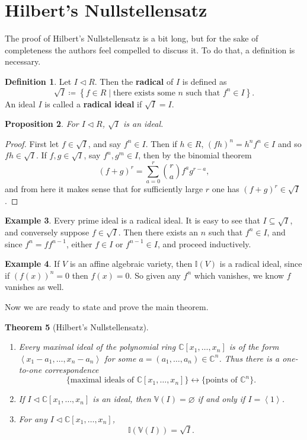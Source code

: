 \documentclass[letterpaper]{article}
\newtheorem{theorem}{Theorem}[section]
\newtheorem{proposition}[theorem]{Proposition}
\theoremstyle{definition}
\newtheorem{definition}[theorem]{Definition}
\newtheorem{example}[theorem]{Example}
\theoremstyle{remark}
\newcommand\CC{\mathbb{C}}
\newcommand\VV{\mathbb{V}}
\newcommand\II{\mathbb{I}}
\newcommand{\defeq}{\coloneqq}
\newcommand{\ideal}{\vartriangleleft}
\newcommand{\brackets}[1]{\left[#1\right]}
\newcommand{\setbraces}[1]{\left\{#1\right\}}
\newcommand{\abrackets}[1]{\left\langle#1\right\rangle}
\begin{document}
\section{Hilbert's Nullstellensatz}
The proof of Hilbert's Nullstellensatz is a bit long, but for the sake of completeness the authors feel compelled to discuss it. To do that, a definition is necessary. \begin{definition}
    Let $I\ideal R$. Then the \textbf{radical} of $I$ is defined as \[\sqrt I\defeq \setbraces{f\in R\mid \text{there exists some }n\text{ such that } f^n\in I}.\] An ideal $I$ is called a \textbf{radical ideal} if $\sqrt I = I$. 
\end{definition}
\begin{proposition}
    For $I\ideal R$, $\sqrt I$ is an ideal.
\end{proposition} \begin{proof} First let $f\in\sqrt I$, and say $f^n\in I$. Then if $h\in R$, $(fh)^n=h^nf^n\in I$ and so $fh\in \sqrt I$. If $f,g\in \sqrt I$, say $f^n,g^m\in I$, then by the binomial theorem \[(f+g)^r=\sum_{a=0}^r \binom{r}{a}f^ag^{r-a},\] and from here it makes sense that for sufficiently large $r$ one has $(f+g)^r\in \sqrt I$. 
\end{proof} \begin{example}
    Every prime ideal is a radical ideal. It is easy to see that $I\subseteq \sqrt I$, and conversely suppose $f\in \sqrt I$. Then there exists an $n$ such that $f^n\in I$, and since $f^n=ff^{n-1}$, either $f\in I$ or $f^{n-1}\in I$, and proceed inductively. 
\end{example}
\begin{example}\label{ex:I-is-radical}
	If \(V\) is an affine algebraic variety, then \(\II(V)\) is a radical ideal, since if \((f(x))^n=0\) then \(f(x)=0\). So given any \(f^n\) which vanishes, we know \(f\) vanishes as well. 
\end{example}
Now we are ready to state and prove the main theorem. \begin{theorem}[Hilbert's Nullstellensatz]\label{Nullstellensatz} $~$
    \begin{enumerate}[label=(\roman*)]
        \item Every maximal ideal of the polynomial ring $\CC\brackets{x_1,\dots,x_n}$ is of the form $\abrackets{x_1-a_1,\dots, x_n-a_n}$ for some $a=(a_1,\dots,a_n)\in\CC^n$. Thus there is a one-to-one correspondence \[\{\text{maximal ideals of }\CC[x_1,\dots,x_n] \}\longleftrightarrow \{\text{points of }\CC^n\}.\]

        \item If $I\ideal \CC[x_1,\dots,x_n]$ is an ideal, then $\VV(I)=\varnothing$ if and only if $I=\abrackets{1}$. 
        \item For any $I\ideal \CC[x_1,\dots,x_n]$, \[\II(\VV(I))=\sqrt I.\]
    \end{enumerate}
\end{theorem}
\end{document}
